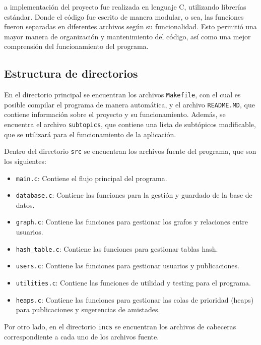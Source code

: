 \documentclass[9pt,letterpaper,onecolumn]{rho-class/rho}
\begin{document}
    a implementación del proyecto fue realizada en lenguaje C, utilizando librerías estándar. Donde el código fue escrito de manera modular, o sea, las funciones fueron separadas en diferentes archivos según su funcionalidad. Esto permitió una mayor manera de organización y mantenimiento del código, así como una mejor comprensión del funcionamiento del programa.

    \subsection{Estructura de directorios}
    En el directorio principal se encuentran los archivos \texttt{Makefile}, con el cual es posible compilar el programa de manera automática, y el archivo \texttt{README.MD}, que contiene información sobre el proyecto y su funcionamiento. Además, se encuentra el archivo \texttt{subtopics}, que contiene una lista de subtópicos modificable, que se utilizará para el funcionamiento de la aplicación.

    \vspace{0.5cm}

    Dentro del directorio \texttt{src} se encuentran los archivos fuente del programa, que son los siguientes:
    \begin{itemize}
        \item \texttt{main.c}: Contiene el flujo principal del programa.
        \item \texttt{database.c}: Contiene las funciones para la gestión y guardado de la base de datos.
        \item \texttt{graph.c}: Contiene las funciones para gestionar los grafos y relaciones entre usuarios.
        \item \texttt{hash\_table.c}: Contiene las funciones para gestionar tablas hash.
        \item \texttt{users.c}: Contiene las funciones para gestionar usuarios y publicaciones.
        \item \texttt{utilities.c}: Contiene las funciones de utilidad y testing para el programa.
        \item \texttt{heaps.c}: Contiene las funciones para gestionar las colas de prioridad (heaps) para publicaciones y sugerencias de amistades.
    \end{itemize}

    Por otro lado, en el directorio \texttt{incs} se encuentran los archivos de cabeceras correspondiente a cada uno de los archivos fuente.
\end{document}

